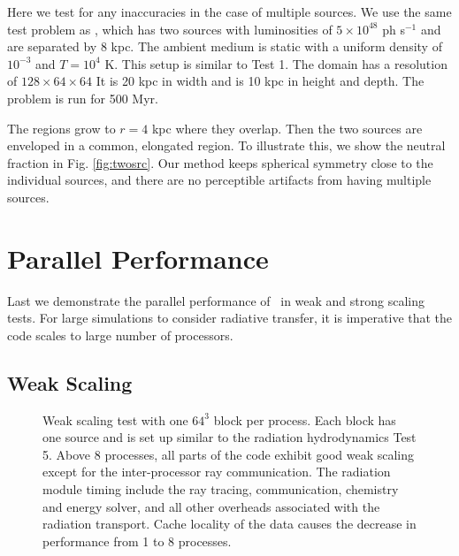 \documentclass[useAMS,usenatbib]{mn2e}
\begin{document}
Here we test for any inaccuracies in the case of multiple sources.  We
use the same test problem as \citet[][\S5.1.2]{Petkova09}, which has
two sources with luminosities of $5 \times 10^{48}$ ph s$^{-1}$ and
are separated by 8 kpc.  The ambient medium is static with a uniform
density of $10^{-3}$ \cubecm and $T = 10^4$ K.  This setup is similar
to Test 1.  The domain has a resolution of $128 \times 64 \times 64$
It is 20 kpc in width and is 10 kpc in height and depth.  The problem
is run for 500 Myr.

The \hii regions grow to $r = 4$ kpc where they overlap.  Then
the two sources are enveloped in a common, elongated \hii
region.  To illustrate this, we show the neutral fraction in Fig.
\ref{fig:twosrc}.  Our method keeps spherical symmetry close to the
individual sources, and there are no perceptible artifacts from having
multiple sources.

\section{Parallel Performance}

Last we demonstrate the parallel performance of \moray~in weak and
strong scaling tests.  For large simulations to consider radiative
transfer, it is imperative that the code scales to large number of
processors.

\subsection{Weak Scaling}
\label{sec:weak_sc}

\begin{figure}
  \caption{\label{fig:weak} Weak scaling test with one $64^3$ block
    per process.  Each block has one source and is set up similar to
    the radiation hydrodynamics Test 5.  Above 8 processes, all parts
    of the code exhibit good weak scaling except for the
    inter-processor ray communication.  The radiation module timing
    include the ray tracing, communication, chemistry and energy
    solver, and all other overheads associated with the radiation
    transport.  Cache locality of the data causes the decrease in
    performance from 1 to 8 processes.}
\end{figure}
\end{document}
